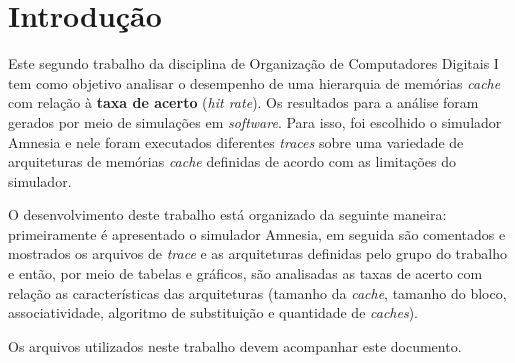 \section{Introdução \label{sec:introducao}}

Este segundo trabalho da disciplina de Organização de Computadores Digitais I tem como objetivo analisar o desempenho de uma hierarquia de memórias \textit{cache} com relação à \textbf{taxa de acerto} (\textit{hit rate}). Os resultados para a análise foram gerados por meio de simulações em \textit{software}. Para isso, foi escolhido o simulador Amnesia \cite{bib:amnesia} e nele foram executados diferentes \textit{traces} sobre uma variedade de arquiteturas de memórias \textit{cache} definidas de acordo com as limitações do simulador.

O desenvolvimento deste trabalho está organizado da seguinte maneira: primeiramente é apresentado o simulador Amnesia, em seguida são comentados e mostrados os arquivos de \textit{trace} e as arquiteturas definidas pelo grupo do trabalho e então, por meio de tabelas e gráficos, são analisadas as taxas de acerto com relação as características das arquiteturas (tamanho da \textit{cache}, tamanho do bloco, associatividade, algoritmo de substituição e quantidade de \textit{caches}).

Os arquivos utilizados neste trabalho devem acompanhar este documento.


